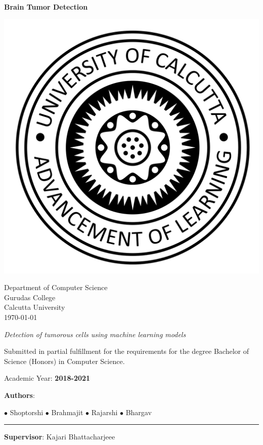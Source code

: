 \documentclass[11pt]{article}
\begin{document}
	\begin{titlepage}
		\begin{center}

			\vspace*{0.5cm}

			\Huge
			\textbf{Brain Tumor Detection}

			\vspace{0.8cm}

			\includegraphics[width=0.4\linewidth]{imgs/cu_logo.png}

			\vspace{1cm}

			\normalsize
			Department of Computer Science\\
			Gurudas College\\
			Calcutta University\\
			\today

			\vspace{0.5cm}
			\textit{Detection of tumorous cells using machine learning models}

			\vspace{1cm}

			\normalsize
			Submitted in partial fulfillment for the requirements for the
			degree Bachelor of Science (Honors) in Computer Science.

			Academic Year: \textbf{2018-2021}

			\vfill
			\textbf{Authors}:

			$\bullet$ Shoptorshi \space\space
			$\bullet$ Brahmajit \space\space
			$\bullet$ Rajarshi \space\space
			$\bullet$ Bhargav

			\vspace{1cm}
			\rule{5cm}{0.4pt}

			\textbf{Supervisor}: Kajari Bhattacharjeee

		\end{center}
	\end{titlepage}
\end{document}

